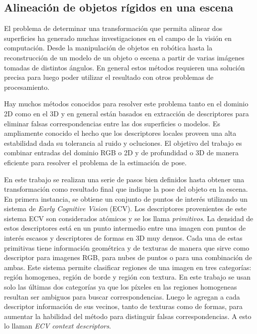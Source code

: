 \subsection{Alineación de objetos rígidos en una escena}\label{alignment_prerejective}
El problema de determinar una transformación que permita alinear dos superficies ha generado muchas investigaciones en el campo de la visión en computación. Desde la manipulación de objetos en robótica hasta la reconstrucción de un modelo de un objeto o escena a partir de varias imágenes tomadas de distintos ángulos. En general estos métodos requieren una solución precisa para luego poder utilizar el resultado con otros problemas de procesamiento.

Hay muchos métodos conocidos para resolver este problema tanto en el dominio 2D como en el 3D y en general están basados en extracción de descriptores para eliminar falsas correspondencias entre las dos superficies o modelos. Es ampliamente conocido el hecho que los descriptores locales proveen una alta estabilidad dada su tolerancia al ruido y ocluciones. El objetivo del trabajo \cite{6630856} es combinar entradas del dominio RGB o 2D y de profundidad o 3D de manera eficiente para resolver el problema de la estimación de pose.

En este trabajo se realizan una serie de pasos bien definidos hasta obtener una transformación como resultado final que indique la pose del objeto en la escena. En primera instancia, se obtiene un conjunto de puntos de interés utilizando un sistema de \textit{Early Cognitive Vision} (ECV). Los descriptores provenientes de este sistema ECV son considerados atómicos y se los llama \textit{primitivos}. La densidad de estos descriptores está en un punto intermedio entre una imagen con puntos de interés escasos y descriptores de formas en 3D muy densos. Cada una de estas primitivas tiene información geométrica y de texturas de manera que sirve como descriptor para imagenes RGB, para nubes de puntos o para una combinación de ambas. Este sistema permite clasificar regiones de una imagen en tres categorías: región homogenea, región de borde y región con textura. En este trabajo se usan solo las últimas dos categorías ya que los píxeles en las regiones homogeneas resultan ser ambiguos para buscar correspondencias. Luego le agregan a cada descriptor información de sus vecinos, tanto de texturas como de formas, para aumentar la habilidad del método para distinguir falsas correspondencias. A esto lo llaman \textit{ECV context descriptors}.

